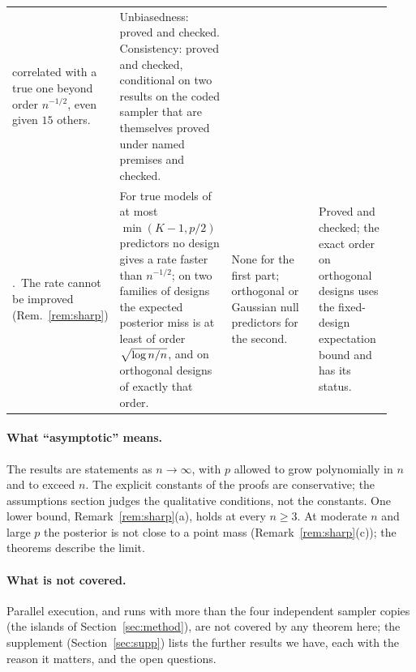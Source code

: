 \begin{table}[ht]
\begin{tabular}{@{}>{\raggedright\arraybackslash}p{0.17\linewidth}>{\raggedright\arraybackslash}p{0.3\linewidth}>{\raggedright\arraybackslash}p{0.26\linewidth}>{\raggedright\arraybackslash}p{0.2\linewidth}@{}}
correlated with a true one beyond order $n^{-1/2}$, even given $15$ others. &
Unbiasedness: proved and checked. Consistency: proved and checked, conditional on two results on the coded sampler that
are themselves proved under named premises and checked. \\
5.~The rate cannot be improved (Rem.~\ref{rem:sharp}) &
For true models of at most $\min(K-1,p/2)$ predictors no design gives a rate faster than $n^{-1/2}$; on two
families of designs the expected posterior miss is at least of order $\sqrt{\log n/n}$, and on orthogonal designs of exactly that
order. &
None for the first part; orthogonal or Gaussian null predictors for the second. &
Proved and checked; the exact order on orthogonal designs uses the fixed-design expectation bound and has its
status. \\
\bottomrule
\end{tabular}
\end{table}

\paragraph{What ``asymptotic'' means.} The results are statements as $n\to\infty$, with $p$ allowed to grow polynomially
in $n$ and to exceed $n$. The explicit constants of the proofs are conservative; the
assumptions section judges the qualitative conditions, not the constants. One lower bound, Remark~\ref{rem:sharp}(a), holds at every $n\ge3$. At moderate $n$ and
large $p$ the posterior is not close to a point mass (Remark~\ref{rem:sharp}(c)); the theorems describe the limit.

\paragraph{What is not covered.} Parallel execution, and runs with more than the four independent sampler copies (the islands of
Section~\ref{sec:method}), are not covered by any theorem here; the
supplement (Section~\ref{sec:supp}) lists the further results we have, each with the reason it matters, and the open
questions.
